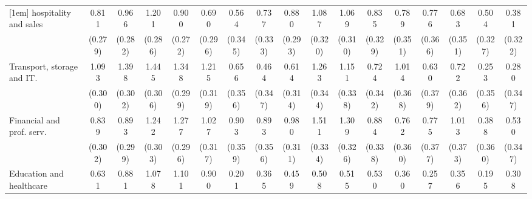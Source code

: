 {\begin{tabular}{l*{16}{c}}
[1em]
hospitality and sales&       0.811\sym{**} &       0.966\sym{***}&       1.201\sym{***}&       0.900\sym{***}&       0.690\sym{*}  &       0.564         &       0.737\sym{*}  &       0.880\sym{**} &       1.087\sym{***}&       1.069\sym{***}&       0.835\sym{*}  &       0.789\sym{*}  &       0.776\sym{*}  &       0.683         &       0.504         &       0.381         \\
                    &     (0.279)         &     (0.282)         &     (0.286)         &     (0.272)         &     (0.296)         &     (0.345)         &     (0.333)         &     (0.293)         &     (0.320)         &     (0.310)         &     (0.329)         &     (0.351)         &     (0.366)         &     (0.351)         &     (0.327)         &     (0.322)         \\
[1em]
Transport, storage and IT.&       1.093\sym{***}&       1.398\sym{***}&       1.445\sym{***}&       1.348\sym{***}&       1.215\sym{***}&       0.656         &       0.464         &       0.614         &       1.263\sym{***}&       1.151\sym{***}&       0.724\sym{*}  &       1.014\sym{**} &       0.630         &       0.722\sym{*}  &       0.253         &       0.280         \\
                    &     (0.300)         &     (0.302)         &     (0.306)         &     (0.299)         &     (0.319)         &     (0.356)         &     (0.347)         &     (0.314)         &     (0.344)         &     (0.338)         &     (0.342)         &     (0.368)         &     (0.379)         &     (0.362)         &     (0.356)         &     (0.347)         \\
[1em]
Financial and prof. serv.&       0.839\sym{**} &       0.893\sym{**} &       1.242\sym{***}&       1.277\sym{***}&       1.027\sym{**} &       0.903\sym{*}  &       0.893\sym{*}  &       0.980\sym{**} &       1.511\sym{***}&       1.309\sym{***}&       0.884\sym{**} &       0.762\sym{*}  &       0.775\sym{*}  &       1.013\sym{**} &       0.388         &       0.530         \\
                    &     (0.302)         &     (0.299)         &     (0.303)         &     (0.296)         &     (0.317)         &     (0.359)         &     (0.356)         &     (0.311)         &     (0.334)         &     (0.326)         &     (0.338)         &     (0.360)         &     (0.377)         &     (0.373)         &     (0.360)         &     (0.347)         \\
[1em]
Education and healthcare&       0.631         &       0.881\sym{**} &       1.078\sym{**} &       1.101\sym{**} &       0.900\sym{*}  &       0.201         &       0.365         &       0.459         &       0.508         &       0.515         &       0.530         &       0.360         &       0.257         &       0.356         &       0.195         &       0.308         \\

\end{tabular}}
